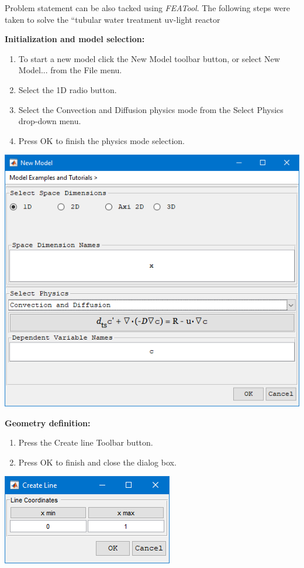 \documentclass{article}
\begin{document}
Problem statement can be also tacked using \emph{FEATool}. The following steps were taken to solve the ``tubular water treatment uv-light reactor

\textbf{Initialization and model selection:}
\begin{enumerate}
\item To start a new model click the New Model toolbar button, or select New Model... from the File menu.
\item Select the 1D radio button.
\item Select the Convection and Diffusion physics mode from the Select Physics drop-down menu.
\item Press OK to finish the physics mode selection.
\end{enumerate}

\begin{center}
\includegraphics[scale=0.60]{./matlab/FEATool_steps/initializationAndModelSelection.png}
\end{center}

\textbf{Geometry definition:}
\begin{enumerate}[resume]
\item Press the Create line Toolbar button.
\item Press OK to finish and close the dialog box.
\end{enumerate}

\begin{center}
\includegraphics[scale=0.60]{./matlab/FEATool_steps/geometryDefinition.png}
\end{center}
\end{document}
